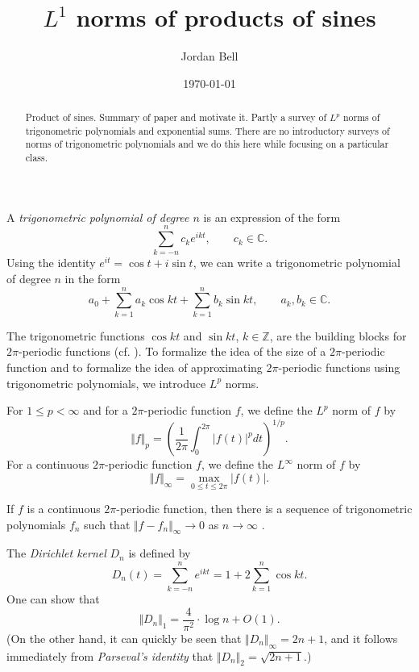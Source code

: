 \documentclass{amsart}
\newcommand{\norm}[1]{\Vert #1 \Vert}
\begin{document}
\title{$L^1$ norms of products of sines}
\author{Jordan Bell}
\address{Department of Mathematics, University of Toronto, Toronto, Ontario, Canada}
\date{\today}
\begin{abstract}
Product of sines. Summary of paper and motivate it. Partly a survey of $L^p$ norms of trigonometric polynomials and exponential sums. There are no
introductory surveys of norms of trigonometric polynomials and we do this here while focusing on a particular class.
\end{abstract}
\maketitle

A {\em trigonometric polynomial of degree $n$} is an expression  of the form
\[
\sum_{k=-n}^n c_k e^{ikt}, \qquad c_k \in \mathbb{C}.
\]
Using the identity $e^{it}=\cos t+i\sin t$, we can write a trigonometric polynomial of degree $n$ in the form
\[
a_0+\sum_{k=1}^n a_k \cos kt + \sum_{k=1}^n b_k \sin kt, \qquad a_k, b_k \in \mathbb{C}.
\]


The trigonometric functions $\cos kt$ and $\sin kt$, $k \in \mathbb{Z}$, are the building blocks for $2\pi$-periodic functions (cf. \cite{MR1204601}). To
formalize the idea of the size of a $2\pi$-periodic function and to formalize the idea of approximating $2\pi$-periodic functions using trigonometric polynomials,
we introduce $L^p$ norms. 

For $1 \leq p < \infty$ and for a $2\pi$-periodic function $f$, we define the $L^p$ norm of $f$ by
\[
\norm{f}_p=\left(\frac{1}{2\pi} \int_0^{2\pi} |f(t)|^p dt \right)^{1/p}.
\]
For a continuous $2\pi$-periodic function $f$, we define the $L^\infty$ norm of $f$ by
\[
\norm{f}_\infty=\max_{0 \leq t \leq 2\pi} |f(t)|.
\] 


If $f$ is a continuous $2\pi$-periodic function, then there is a sequence of trigonometric polynomials $f_n$ such that
$\norm{f-f_n}_\infty \to 0$ as $n \to \infty$
\cite[p.~54, Corollary~5.4]{steinI}. 

The {\em Dirichlet kernel} $D_n$ is defined by
\[
D_n(t)=\sum_{k=-n}^n e^{ikt}=1+2\sum_{k=1}^n \cos kt.
\]
One can show \cite[p.~71, Exercise 1.1]{katznelson} that
\[
\norm{D_n}_1 = \frac{4}{\pi^2}\cdot \log n+O(1).
\]
(On the other hand, it can quickly be seen that $\norm{D_n}_\infty=2n+1$, and it follows immediately from {\em Parseval's identity} that
$\norm{D_n}_2=\sqrt{2n+1}$.)
\end{document}
